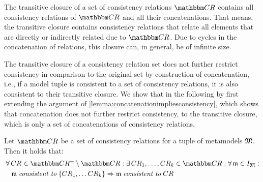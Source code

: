 The transitive closure of a set of consistency relations $\consistencyrelationset{CR}$ contains all consistency relations of $\consistencyrelationset{CR}$ and all their concatenations. That means, the transitive closure contains consistency relations that relate all elements that are directly or indirectly related due to $\consistencyrelationset{CR}$.
Due to cycles in the concatenation of relations, this closure can, in general, be of infinite size.

The transitive closure of a consistency relation set does not further restrict consistency in comparison to the original set by construction of concatenation, i.e., if a model tuple is consistent to a set of consistency relations, it is also consistent to their transitive closure.
We show that in the following by first extending the argument of \autoref{lemma:concatenationimpliesconsistency}, which shows that concatenation does not further restrict consistency, to the transitive closure, which is only a set of concatenations of consistency relations.

\begin{lemma}
    Let $\consistencyrelationset{CR}$ be a set of consistency relations for a tuple of metamodels $\metamodeltuple{M}$. 
    Then it holds that:
    \begin{align*}
        &
        \forall \consistencyrelation{CR}{} \in \transitiveclosure{\consistencyrelationset{CR}{}} \setminus \consistencyrelationset{CR} :
        \exists \consistencyrelation{CR}{1}, \dots, \consistencyrelation{CR}{k} \in \consistencyrelationset{CR} : \forall \modeltuple{m} \in \metamodeltupleinstanceset{M} : \\
        & \formulaskip
        \modeltuple{m} \consistenttomath \setted{\consistencyrelation{CR}{1}, \dots \consistencyrelation{CR}{k}} \Rightarrow \modeltuple{m} \consistenttomath \consistencyrelation{CR}{} 
    \end{align*}
\end{lemma}

